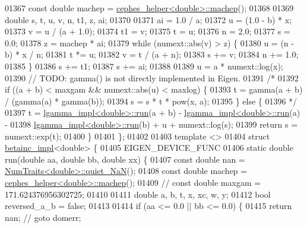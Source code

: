 \begin{DoxyCode}
01367     \textcolor{keyword}{const} \textcolor{keywordtype}{double} machep = \hyperlink{struct_eigen_1_1internal_1_1cephes__helper}{cephes\_helper<double>::machep}();
01368 
01369     \textcolor{keywordtype}{double} s, t, u, v, n, t1, z, ai;
01370 
01371     ai = 1.0 / a;
01372     u = (1.0 - b) * x;
01373     v = u / (a + 1.0);
01374     t1 = v;
01375     t = u;
01376     n = 2.0;
01377     s = 0.0;
01378     z = machep * ai;
01379     \textcolor{keywordflow}{while} (numext::abs(v) > z) \{
01380       u = (n - b) * x / n;
01381       t *= u;
01382       v = t / (a + n);
01383       s += v;
01384       n += 1.0;
01385     \}
01386     s += t1;
01387     s += ai;
01388 
01389     u = a * numext::log(x);
01390     \textcolor{comment}{// TODO: gamma() is not directly implemented in Eigen.}
01391     \textcolor{comment}{/*}
01392 \textcolor{comment}{    if ((a + b) < maxgam && numext::abs(u) < maxlog) \{}
01393 \textcolor{comment}{      t = gamma(a + b) / (gamma(a) * gamma(b));}
01394 \textcolor{comment}{      s = s * t * pow(x, a);}
01395 \textcolor{comment}{    \} else \{}
01396 \textcolor{comment}{    */}
01397     t = \hyperlink{struct_eigen_1_1internal_1_1lgamma__impl}{lgamma\_impl<double>::run}(a + b) - 
      \hyperlink{struct_eigen_1_1internal_1_1lgamma__impl}{lgamma\_impl<double>::run}(a) -
01398         \hyperlink{struct_eigen_1_1internal_1_1lgamma__impl}{lgamma\_impl<double>::run}(b) + u + numext::log(s);
01399     \textcolor{keywordflow}{return} s = numext::exp(t);
01400   \}
01401 \};
01402 
01403 \textcolor{keyword}{template} <>
01404 \textcolor{keyword}{struct }\hyperlink{struct_eigen_1_1internal_1_1betainc__impl}{betainc\_impl}<double> \{
01405   EIGEN\_DEVICE\_FUNC
01406   \textcolor{keyword}{static} \textcolor{keywordtype}{double} run(\textcolor{keywordtype}{double} aa, \textcolor{keywordtype}{double} bb, \textcolor{keywordtype}{double} xx) \{
01407     \textcolor{keyword}{const} \textcolor{keywordtype}{double} nan = \hyperlink{group___core___module_struct_eigen_1_1_num_traits}{NumTraits<double>::quiet\_NaN}();
01408     \textcolor{keyword}{const} \textcolor{keywordtype}{double} machep = \hyperlink{struct_eigen_1_1internal_1_1cephes__helper}{cephes\_helper<double>::machep}();
01409     \textcolor{comment}{// const double maxgam = 171.624376956302725;}
01410 
01411     \textcolor{keywordtype}{double} a, b, t, x, xc, w, y;
01412     \textcolor{keywordtype}{bool} reversed\_a\_b = \textcolor{keyword}{false};
01413 
01414     \textcolor{keywordflow}{if} (aa <= 0.0 || bb <= 0.0) \{
01415       \textcolor{keywordflow}{return} nan;  \textcolor{comment}{// goto domerr;}

\end{DoxyCode}
